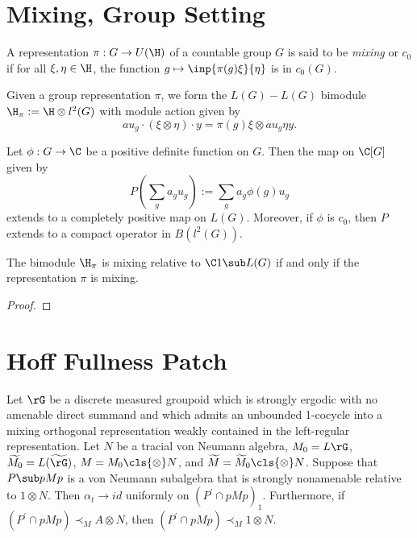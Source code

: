 \documentclass[../main.tex]{subfiles}
\begin{document}
\section{Mixing, Group Setting}

\begin{definition}
    A representation $ \pi:G\to U(\H) $ of a countable group $ G $ is said to be \textit{mixing} or $ c_{0} $ if for all $ \xi,\eta\in \H $, the function $ g\mapsto \inp{\pi(g) \xi}{\eta} $ is in $ c_{0}(G) $.
\end{definition}

Given a group representation $ \pi $, we form the $ L(G)-L(G) $ bimodule $ \H_{\pi}:= \H \otimes l^{2}(G) $ with module action given by 
\[
    au_{g} \cdot ( \xi \otimes \eta) \cdot y = \pi(g) \xi \otimes au_{g} \eta y.
\]


\begin{lemma}
    Let $ \phi:G\to \C $ be a positive definite function on $ G $. Then the map on $ \C[G] $ given by
    \[
        P(\sum_{g} a_{g} u_{g}) := \sum_{g}a_{g} \phi(g) u_{g}
    \]
    extends to a completely positive map on $ L(G) $. Moreover, if $ \phi $ is $ c_{0} $, then $ P $ extends to a compact operator in $ B(l^{2}(G)) $.
\end{lemma}

\begin{theorem}
    The bimodule $ \H_{\pi} $ is mixing relative to $ \C1\sub L(G) $ if and only if the representation $ \pi $ is mixing.
\end{theorem}

\begin{proof}
    
\end{proof}

\section{Hoff Fullness Patch}

\begin{lemma}
    Let $\rG$ be a discrete measured groupoid which is strongly ergodic with no amenable direct summand and which admits an unbounded 1-cocycle into a mixing orthogonal representation weakly contained in the left-regular representation. Let $ N $ be a tracial von Neumann algebra, $ M_{0}=L{\rG} $, $ \widetilde{M_{0}} = L(\widetilde{\rG}) $, $ M = M_{0} \cls{\otimes} N  $, and $ \widetilde{M} = \widetilde{M}_{0} \cls{\otimes } N $. Suppose that $ P\sub pMp $ is a von Neumann subalgebra that is strongly nonamenable relative to $ 1 \otimes N $. Then $ \alpha_{t}\to id $ uniformly on $ (P^{\prime}\cap pMp)_{1} $. Furthermore, if $ (P^{\prime}\cap pMp)\prec_{M} A \otimes N $, then $ (P^{\prime}\cap pMp) \prec_{M} 1 \otimes N$. 
\end{lemma}
\end{document}
